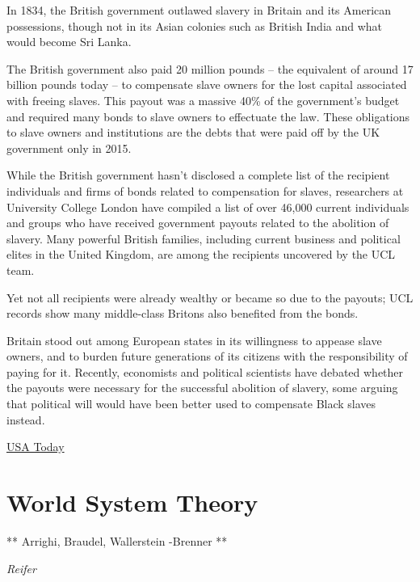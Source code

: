 \documentclass[
]{book}
\begin{document}
In 1834, the British government outlawed slavery in Britain and its American possessions, though not in its Asian colonies such as British India and what would become Sri Lanka.

The British government also paid 20 million pounds -- the equivalent of around 17 billion pounds today -- to compensate slave owners for the lost capital associated with freeing slaves. This payout was a massive 40\% of the government's budget and required many bonds to slave owners to effectuate the law.
These obligations to slave owners and institutions are the debts that were paid off by the UK government only in 2015.

While the British government hasn't disclosed a complete list of the recipient individuals and firms of bonds related to compensation for slaves, researchers at University College London have compiled a list of over 46,000 current individuals and groups who have received government payouts related to the abolition of slavery. Many powerful British families, including current business and political elites in the United Kingdom, are among the recipients uncovered by the UCL team.

Yet not all recipients were already wealthy or became so due to the payouts; UCL records show many middle-class Britons also benefited from the bonds.

Britain stood out among European states in its willingness to appease slave owners, and to burden future generations of its citizens with the responsibility of paying for it.
Recently, economists and political scientists have debated whether the payouts were necessary for the successful abolition of slavery, some arguing that political will would have been better used to compensate Black slaves instead.

\href{https://eu.usatoday.com/story/news/factcheck/2020/06/30/fact-check-u-k-paid-off-debts-slave-owning-families-2015/3283908001/}{USA Today}

\hypertarget{world-system-theory}{%
\section{World System Theory}\label{world-system-theory}}

** Arrighi, Braudel, Wallerstein -Brenner **

\emph{Reifer}
\end{document}
